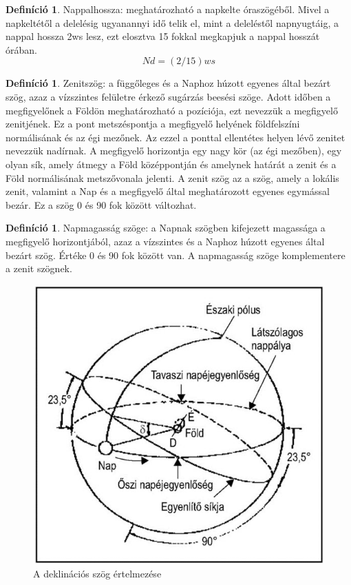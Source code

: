\documentclass[
]{thesis-ekf}
\theoremstyle{definition}
\newtheorem{definicio}[tetel]{Definíció}
\theoremstyle{remark}
\begin{document}
			\begin{definicio}
				Nappalhossza: meghatározható a napkelte óraszögéből. Mivel a napkeltétől a delelésig ugyanannyi idő telik el, mint a deleléstől napnyugtáig, a nappal hossza 2ws lesz, ezt elosztva 15 fokkal megkapjuk a nappal hosszát órában.
				\[Nd = (2/15) ws\]
				\cite{Kornyezet}
			\end{definicio}
			\begin{definicio}
				Zenitszög: a függőleges és a Naphoz húzott egyenes által bezárt szög, azaz a vízszintes felületre érkező sugárzás beesési szöge. Adott időben a megfigyelőnek a Földön meghatározható a pozíciója, ezt nevezzük a megfigyelő zenitjének. Ez a pont metszéspontja a megfigyelő helyének földfelszíni normálisának és az égi mezőnek. Az ezzel a ponttal ellentétes helyen lévő zenitet nevezzük nadírnak. A megfigyelő horizontja egy nagy kör (az égi mezőben), egy olyan sík, amely átmegy a Föld középpontján és amelynek határát a zenit és a Föld normálisának metszővonala jelenti. A zenit szög az a szög, amely a lokális zenit, valamint a Nap és a megfigyelő által meghatározott egyenes egymással bezár. Ez a szög 0 és 90 fok között változhat.
				\cite{Kornyezet}
			\end{definicio}
			\begin{definicio}
				Napmagasság szöge: a Napnak szögben kifejezett magassága a megfigyelő horizontjából, azaz a vízszintes és a Naphoz húzott egyenes által bezárt szög. Értéke 0 és 90 fok között van. A napmagasság szöge komplementere a zenit szögnek.
				\cite{Kornyezet}
			\end{definicio}
			\begin{figure}[h]
				\centering
				\includegraphics[scale=0.30]{declination}
				\caption{A deklinációs szög értelmezése}
				\label{fig:declination}
			\end{figure}
\end{document}

